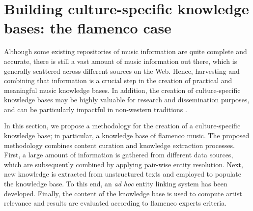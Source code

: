 \section[Building culture-specific knowledge bases: the flamenco case][Building culture-specific KBs: the flamenco case]{Building culture-specific knowledge bases: the flamenco case}
\label{sec:musicology:flamenco-kb}


Although some existing repositories of music information are quite complete and accurate, there is still a vast amount of music information out there, which is generally scattered across different sources on the Web. Hence, harvesting and combining that information is a crucial step in the creation of practical and meaningful music knowledge bases. In addition, the creation of culture-specific knowledge bases may be highly valuable for research and dissemination purposes, and can be particularly impactful in non-western traditions \citep{Serra2014compmusic}. 

In this section, we propose a methodology for the creation of a culture-specific knowledge base; in particular, a knowledge base of flamenco music. The proposed methodology combines content curation and knowledge extraction processes. First, a large amount of information is gathered from different data sources, which are subsequently combined by applying pair-wise entity resolution. Next, new knowledge is extracted from unstructured texts and employed to populate the knowledge base. To this end, an \textit{ad hoc} entity linking system has been developed. Finally, the content of the knowledge base is used to compute artist relevance and results are evaluated according to flamenco experts criteria. %


